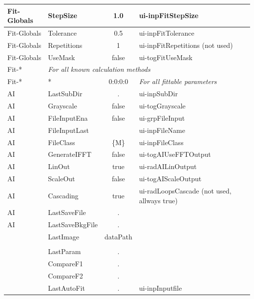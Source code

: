\documentclass[11pt]{article} %
\begin{document}
\begin{longtable}{|l|l|c|l|}
Fit-Globals & StepSize & 1.0 & ui-inpFitStepSize \\ \hline
Fit-Globals & Tolerance & 0.5 & ui-inpFitTolerance \\ \hline
Fit-Globals & Repetitions & 1 & ui-inpFitRepetitions (not used) \\ \hline
Fit-Globals & UseMask & false & ui-togFitUseMask \\ \hline
Fit-* & \multicolumn{3}{l|}{\it For all known calculation methods} \\ \hline
Fit-* & * & 0:0:0:0 & {\it For all fittable parameters} \\ \hline
AI & LastSubDir & . & ui-inpSubDir \\ \hline
AI & Grayscale & false & ui-togGrayscale \\ \hline
AI & FileInputEna & false & ui-grpFileInput \\ \hline
AI & FileInputLast & & ui-inpFileName \\ \hline
AI & FileClass & \{M\} & ui-inpFileClass \\ \hline
AI & GenerateIFFT & false & ui-togAIUseFFTOutput \\ \hline
AI & LinOut & true & ui-radAILinOutput \\ \hline
AI & ScaleOut & false & ui-togAIScaleOutput \\ \hline
AI & Cascading & true & ui-radLoopsCascade (not used, allways true) \\ \hline
AI & LastSaveFile & . &  \\ \hline
AI & LastSaveBkgFile & . &  \\ \hline
 & LastImage & dataPath &  \\ \hline
\rowcolor{rowkeycol}\multicolumn{4}{|c|}{Masterkey: {\it Parameter} }  \\ \hline
 & LastParam & . & \\ \hline
 & CompareF1 & . &  \\
 & CompareF2 & . &  \\ \hline
 & LastAutoFit & . & ui-inpInputfile \\ \hline

\end{longtable}
\end{document}
